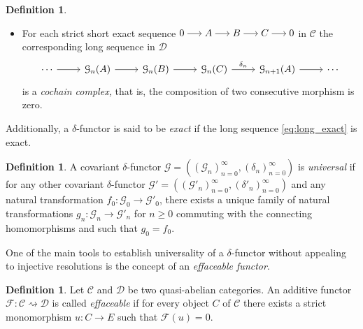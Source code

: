 \documentclass[12pt,a4paper]{amsproc}
\theoremstyle{remark}
\theoremstyle{definition}
\newtheorem{defi}[thm]{Definition}
\numberwithin{equation}{section}
\begin{document}
\begin{defi}
\begin{itemize}
\begin{equation}
        \notag
        \begin{tikzcd}
\mathcal{G}_n(C) \arrow[d] \arrow[r, "\delta_n"] & \mathcal{G}_{n+1}(A) \arrow[d] \\
\mathcal{G}_n(C') \arrow[r, "\delta_n"]          & \mathcal{G}_{n+1}(A')        
\end{tikzcd}
    \end{equation}
    commutes.
    \item For each strict short exact sequence $\begin{tikzcd}[cramped, column sep=1.5em]
		0 \arrow[r] & A \arrow[r] & B \arrow[r] & C \arrow[r] & 0 
	\end{tikzcd} $ in $\mathcal{C}$ the corresponding long sequence in $\mathcal{D}$ 
    \begin{equation}
        \label{eq:long_exact} 
        \begin{tikzcd}
\cdots \arrow[r] & \mathcal{G}_n(A) \arrow[r] & \mathcal{G}_n(B) \arrow[r] & \mathcal{G}_n(C) \arrow[r, "\delta_n"] & \mathcal{G}_{n+1}(A) \arrow[r] & \cdots
\end{tikzcd}
    \end{equation}
    is a \emph{cochain complex,} that is, the composition of two consecutive morphism is zero.
    \end{itemize}
Additionally, a $\delta$-functor is said to be \emph{exact} if the long sequence \eqref{eq:long_exact} is exact. 
\end{defi}

\begin{defi}
	A covariant $\delta$-functor $\mathcal{G}=((\mathcal{G}_n)_{n=0}^{\infty}, (\delta_n)_{n=0}^{\infty})$ is \emph{universal} if for any other covariant $\delta$-functor $\mathcal{G}'=((\mathcal{G}'_n)_{n=0}^{\infty}, (\delta'_n)_{n=0}^{\infty})$ and any natural transformation $f_0:\mathcal{G}_0 \to \mathcal{G}'_0$, there exists a unique family of natural transformations $g_n: \mathcal{G}_n \to \mathcal{G}'_n$ for $n \ge 0$ commuting with the connecting homomorphisms and such that $g_0=f_0$.
\end{defi}

One of the main tools to establish universality of a $\delta$-functor without appealing to injective resolutions is the concept of an \emph{effaceable functor}.

\begin{defi}
	Let $\mathcal{C}$ and $\mathcal{D}$ be two quasi-abelian categories. An additive functor $\mathcal{F}: \mathcal{C} \rightsquigarrow \mathcal{D}$ is called \emph{effaceable} if for every object $C$ of $\mathcal{C}$ there exists a strict monomorphism $u: C \to E$ such that $\mathcal{F}(u)=0$.
\end{defi}
\end{document}
